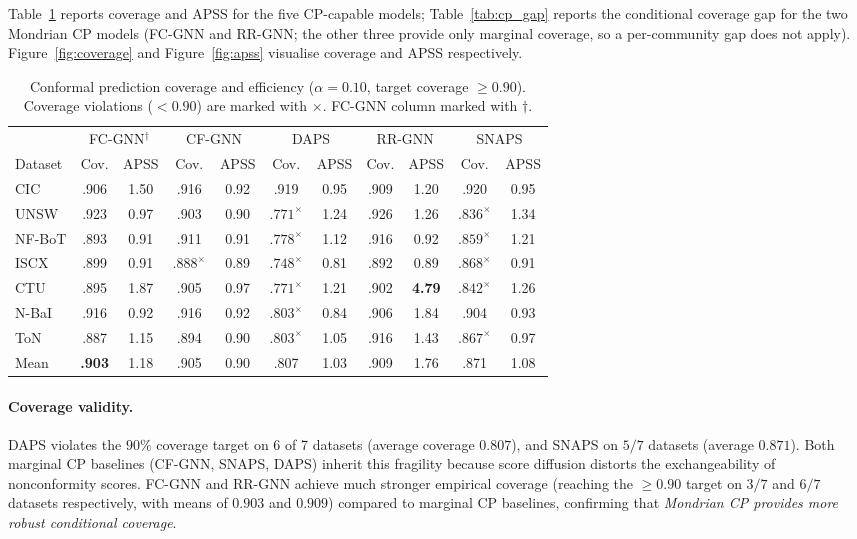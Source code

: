 Table~\ref{tab:cp_main} reports coverage and APSS for the five CP-capable
models; Table~\ref{tab:cp_gap} reports the conditional coverage gap for the
two Mondrian CP models (FC-GNN and RR-GNN; the other three provide only
marginal coverage, so a per-community gap does not apply).
Figure~\ref{fig:coverage} and Figure~\ref{fig:apss} visualise coverage and
APSS respectively.

\begin{table}[t]
\caption{Conformal prediction coverage and efficiency ($\alpha = 0.10$,
         target coverage $\ge 0.90$).
         Coverage violations (${<}0.90$) are marked with $\times$.
         FC-GNN column marked with $\dagger$.}
\label{tab:cp_main}
\setlength{\tabcolsep}{4pt}
\small
\begin{tabular}{l@{\;}cc@{\;}cc@{\;}cc@{\;}cc@{\;}cc}
\toprule
& \multicolumn{2}{c}{FC-GNN$^\dagger$} & \multicolumn{2}{c}{CF-GNN} &
  \multicolumn{2}{c}{DAPS} & \multicolumn{2}{c}{RR-GNN} &
  \multicolumn{2}{c}{SNAPS} \\
\cmidrule(lr){2-3}\cmidrule(lr){4-5}\cmidrule(lr){6-7}
\cmidrule(lr){8-9}\cmidrule(lr){10-11}
Dataset & Cov. & APSS & Cov. & APSS & Cov. & APSS &
         Cov. & APSS & Cov. & APSS \\
\midrule
CIC    & .906 & 1.50 & .916 & 0.92 & .919 & 0.95 & .909 & 1.20 & .920 & 0.95 \\
UNSW   & .923 & 0.97 & .903 & 0.90 & \bfseries$.771^{\times}$ & 1.24 & .926 & 1.26 & $.836^{\times}$ & 1.34 \\
NF-BoT & .893 & 0.91 & .911 & 0.91 & $.778^{\times}$ & 1.12 & .916 & 0.92 & $.859^{\times}$ & 1.21 \\
ISCX   & .899 & 0.91 & $.888^{\times}$ & 0.89 & $.748^{\times}$ & 0.81 & .892 & 0.89 & $.868^{\times}$ & 0.91 \\
CTU    & .895 & 1.87 & .905 & 0.97 & $.771^{\times}$ & 1.21 & .902 & \bfseries 4.79 & $.842^{\times}$ & 1.26 \\
N-BaI  & .916 & 0.92 & .916 & 0.92 & $.803^{\times}$ & 0.84 & .906 & 1.84 & .904 & 0.93 \\
ToN    & .887 & 1.15 & .894 & 0.90 & $.803^{\times}$ & 1.05 & .916 & 1.43 & $.867^{\times}$ & 0.97 \\
\midrule
Mean   & \textbf{.903} & 1.18 & .905 & 0.90 & .807 & 1.03 & .909 & 1.76 & .871 & 1.08 \\
\bottomrule
\end{tabular}
\end{table}

\paragraph{Coverage validity.}
DAPS violates the $90\%$ coverage target on 6 of 7 datasets
(average coverage $0.807$), and SNAPS on $5/7$ datasets (average $0.871$).
Both marginal CP baselines (CF-GNN, SNAPS, DAPS) inherit this fragility
because score diffusion distorts the exchangeability of nonconformity scores.
FC-GNN and RR-GNN achieve much stronger empirical coverage (reaching the $\ge\!0.90$ target on $3/7$ and $6/7$ datasets respectively, with means of $0.903$ and $0.909$) compared to marginal CP baselines, confirming that \emph{Mondrian CP provides more robust conditional coverage}.

